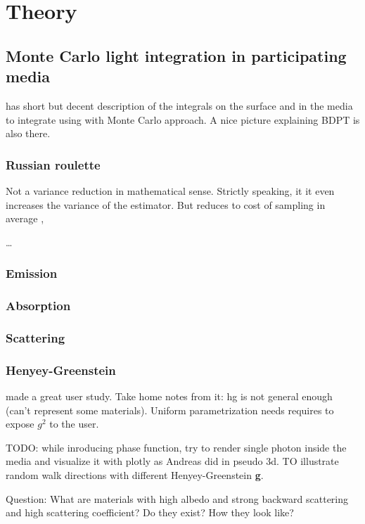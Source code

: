 \chapter{Theory}
\label{chapter:theory}


\section{Monte Carlo light integration in participating media}
\cite{Lafortune:1996:RPM:275458.275468} has short but decent description of the
integrals on the surface and in the media to integrate using with Monte Carlo
approach.
A nice picture explaining BDPT is also there.

\subsection{Russian roulette}
\label{subsection:rr}
Not a variance reduction in mathematical sense. Strictly speaking, it it even
increases the variance of the estimator. But reduces to cost of sampling in
average \cite{Veach:1998:RMC:927297}, \cite{Csi03variancereduction}

\ldots

\subsection{Emission}
\subsection{Absorption}
\subsection{Scattering}

\subsection{Henyey-Greenstein}
\cite{Gkioulekas:2013:IVR:2508363.2508377} made a great user study.
Take home notes from it: \gls{hg} is not general enough (can't represent some
materials). Uniform parametrization needs requires to expose $g^2$ to the user.

TODO: while inroducing phase function, try to render single photon inside the
media and visualize it with plotly as Andreas did in pseudo 3d. TO illustrate
random walk directions with different Henyey-Greenstein \textbf{g}.

Question: What are materials with high albedo and strong backward scattering
and high scattering coefficient? Do they exist? How they look like?


